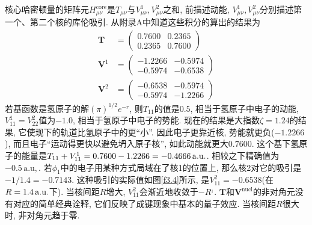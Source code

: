 
核心哈密顿量的矩阵元$H_{\mu\nu}^\mathrm{core}$是$T_{\mu\nu}$与$V_{\mu\nu}^1,V_{\mu\nu}^2$之和, 
前描述动能, 
$V_{\mu\nu}^1,V_{\mu\nu}^2$分别描述第一个、第二个核的库伦吸引. 
从附录A中知道这些积分的算出的结果为
\begin{align}
	\mathbf{T} & = 
	\begin{pmatrix}
		0.7600&0.2365\\0.2365&0.7600
	\end{pmatrix}\\
	\mathbf{V}^1 & = 
	\begin{pmatrix}
		-1.2266&-0.5974\\-0.5974&-0.6538
	\end{pmatrix}\\
	\mathbf{V}^2 & = 
	\begin{pmatrix}
		-0.6538&-0.5974\\-0.5974&-1.2266
	\end{pmatrix}
\end{align}
若基函数是氢原子的解$(\pi)^{1/2}e^{-r}$, 
则$T_{11}$的值是$0.5$, 
相当于氢原子中电子的动能, 
$V_{11}^1=V_{22}^2$值为$-1.0$, 
相当于氢原子中电子的势能. 
现在的结果是大指数$\zeta=1.24$的结果, 
它使现下的轨道比氢原子中的更``小”. 
因此电子更靠近核, 
势能就更负($-1.2266$), 
而且电子``运动得更快以避免坍入原子核”, 
如此动能就更大$0.7600$. 
这个基下氢原子的能量是$T_{11}+V_{11}^1=0.7600-1.2266=-0.4666\,\mathrm{a.u.}$. 
相较之下精确值为$-0.5\,\mathrm{a.u,}$. 
若$\phi_1$中的电子用某种方式局域在了核1的位置上, 
那么核2对它的吸引是$-1/1.4=-0.7143$. 
这种吸引的实际值如图\ref{f3.4}所示, 
是$V_{11}^2=-0.6538$(在$R=1.4\,\mathrm{a.u.}$下). 
当核间距$R$增大, 
$V_{11}^2$会渐近地收敛于$-R^{_1}$. 
$\mathbf{T}$和$\mathbf{V}^\mathrm{nucl}$的非对角元没有对应的简单经典诠释, 
它们反映了成键现象中基本的量子效应. 
当核间距$R$很大时, 
非对角元趋于零.


